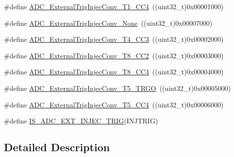 \begin{DoxyCompactItemize}
\#define \mbox{\hyperlink{group___a_d_c__external__trigger__sources__for__injected__channels__conversion_gabd27bcc6ff5af6713a124b3801759bcf}{A\+D\+C\+\_\+\+External\+Trig\+Injec\+Conv\+\_\+\+T1\+\_\+\+C\+C4}}~((uint32\+\_\+t)0x00001000)
\item 
\#define \mbox{\hyperlink{group___a_d_c__external__trigger__sources__for__injected__channels__conversion_gaad11a68fca76d97b97dc2554dac5cb16}{A\+D\+C\+\_\+\+External\+Trig\+Injec\+Conv\+\_\+\+None}}~((uint32\+\_\+t)0x00007000)
\item 
\#define \mbox{\hyperlink{group___a_d_c__external__trigger__sources__for__injected__channels__conversion_gae342ca48595f0b2bf866943969026581}{A\+D\+C\+\_\+\+External\+Trig\+Injec\+Conv\+\_\+\+T4\+\_\+\+C\+C3}}~((uint32\+\_\+t)0x00002000)
\item 
\#define \mbox{\hyperlink{group___a_d_c__external__trigger__sources__for__injected__channels__conversion_gac0320df9aa5e2d378b05f8e4dcc1616a}{A\+D\+C\+\_\+\+External\+Trig\+Injec\+Conv\+\_\+\+T8\+\_\+\+C\+C2}}~((uint32\+\_\+t)0x00003000)
\item 
\#define \mbox{\hyperlink{group___a_d_c__external__trigger__sources__for__injected__channels__conversion_ga6724679fe75f87c029f268ef47841a3e}{A\+D\+C\+\_\+\+External\+Trig\+Injec\+Conv\+\_\+\+T8\+\_\+\+C\+C4}}~((uint32\+\_\+t)0x00004000)
\item 
\#define \mbox{\hyperlink{group___a_d_c__external__trigger__sources__for__injected__channels__conversion_ga1d92236e9eb9f3adf69371f3f698192e}{A\+D\+C\+\_\+\+External\+Trig\+Injec\+Conv\+\_\+\+T5\+\_\+\+T\+R\+GO}}~((uint32\+\_\+t)0x00005000)
\item 
\#define \mbox{\hyperlink{group___a_d_c__external__trigger__sources__for__injected__channels__conversion_gade68a960ba05714e5f0a1f11a086884e}{A\+D\+C\+\_\+\+External\+Trig\+Injec\+Conv\+\_\+\+T5\+\_\+\+C\+C4}}~((uint32\+\_\+t)0x00006000)
\item 
\#define \mbox{\hyperlink{group___a_d_c__external__trigger__sources__for__injected__channels__conversion_ga3cb8cadbff46e432b5e000c3a7489a0b}{I\+S\+\_\+\+A\+D\+C\+\_\+\+E\+X\+T\+\_\+\+I\+N\+J\+E\+C\+\_\+\+T\+R\+IG}}(I\+N\+J\+T\+R\+IG)
\end{DoxyCompactItemize}


\subsection{Detailed Description}



